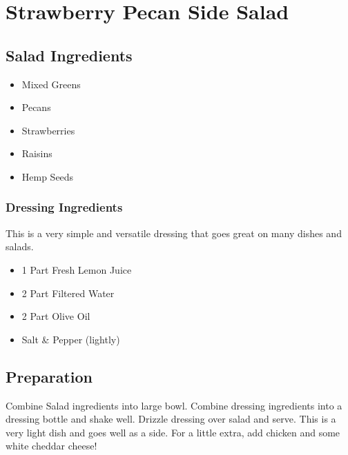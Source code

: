 \thispagestyle{fancy}
\section{Strawberry Pecan Side Salad}
\AddToShipoutPicture*{\StrawberrySalad}

\subsection*{Salad Ingredients}

\begin{multicols}{3}
	\begin{itemize}
		\item Mixed Greens
		\item Pecans
		\item Strawberries
		\item Raisins
		\item Hemp Seeds
	\end{itemize}
\end{multicols}

\subsubsection*{Dressing Ingredients}
This is a very simple and versatile dressing that goes great on many dishes and salads.
\begin{multicols}{3}
	\begin{itemize}
		\item 1 Part Fresh Lemon Juice
		\item 2 Part Filtered Water
		\item 2 Part Olive Oil
		\item Salt \& Pepper (lightly)
	\end{itemize}
\end{multicols}

\subsection*{Preparation}

Combine Salad ingredients into large bowl. Combine dressing ingredients into a dressing bottle and shake well. Drizzle dressing over salad and serve. This is a very light dish and goes well as a side. For a little extra, add chicken and some white cheddar cheese!